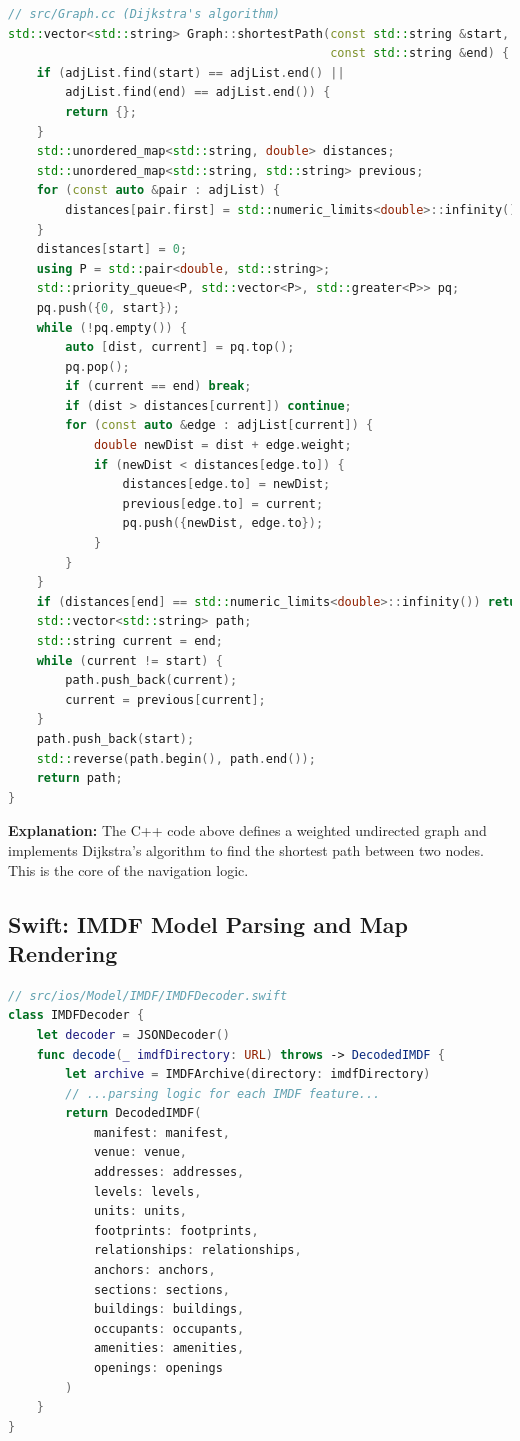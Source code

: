 \documentclass{article}
\begin{document}
\begin{lstlisting}[language=cpp]
// src/Graph.cc (Dijkstra's algorithm)
std::vector<std::string> Graph::shortestPath(const std::string &start,
                                             const std::string &end) {
    if (adjList.find(start) == adjList.end() ||
        adjList.find(end) == adjList.end()) {
        return {};
    }
    std::unordered_map<std::string, double> distances;
    std::unordered_map<std::string, std::string> previous;
    for (const auto &pair : adjList) {
        distances[pair.first] = std::numeric_limits<double>::infinity();
    }
    distances[start] = 0;
    using P = std::pair<double, std::string>;
    std::priority_queue<P, std::vector<P>, std::greater<P>> pq;
    pq.push({0, start});
    while (!pq.empty()) {
        auto [dist, current] = pq.top();
        pq.pop();
        if (current == end) break;
        if (dist > distances[current]) continue;
        for (const auto &edge : adjList[current]) {
            double newDist = dist + edge.weight;
            if (newDist < distances[edge.to]) {
                distances[edge.to] = newDist;
                previous[edge.to] = current;
                pq.push({newDist, edge.to});
            }
        }
    }
    if (distances[end] == std::numeric_limits<double>::infinity()) return {};
    std::vector<std::string> path;
    std::string current = end;
    while (current != start) {
        path.push_back(current);
        current = previous[current];
    }
    path.push_back(start);
    std::reverse(path.begin(), path.end());
    return path;
}
\end{lstlisting}

\textbf{Explanation:} The C++ code above defines a weighted undirected graph and implements Dijkstra's algorithm to find the shortest path between two nodes. This is the core of the navigation logic.

\subsection{Swift: IMDF Model Parsing and Map Rendering}
\begin{lstlisting}[language=swift]
// src/ios/Model/IMDF/IMDFDecoder.swift
class IMDFDecoder {
    let decoder = JSONDecoder()
    func decode(_ imdfDirectory: URL) throws -> DecodedIMDF {
        let archive = IMDFArchive(directory: imdfDirectory)
        // ...parsing logic for each IMDF feature...
        return DecodedIMDF(
            manifest: manifest,
            venue: venue,
            addresses: addresses,
            levels: levels,
            units: units,
            footprints: footprints,
            relationships: relationships,
            anchors: anchors,
            sections: sections,
            buildings: buildings,
            occupants: occupants,
            amenities: amenities,
            openings: openings
        )
    }
}
\end{lstlisting}
\end{document}
